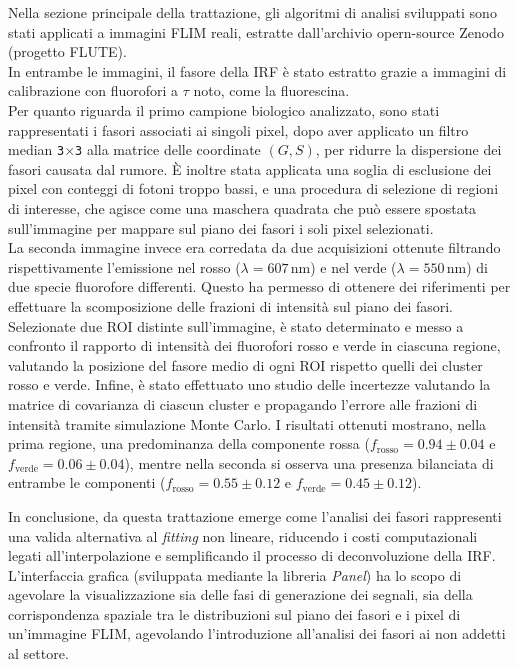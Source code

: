 \documentclass[a4paper, 11pt]{article}
\begin{document}
Nella sezione principale della trattazione, gli algoritmi di analisi sviluppati sono stati applicati a immagini FLIM reali, estratte dall'archivio opern-source Zenodo (progetto FLUTE).\\
In entrambe le immagini, il fasore della IRF è stato estratto grazie a immagini di calibrazione con fluorofori a $\tau$ noto, come la fluorescina.\\
Per quanto riguarda il primo campione biologico analizzato, sono stati rappresentati i fasori associati ai singoli pixel, dopo aver applicato un filtro median \texttt{3}$\times$\texttt{3} alla matrice delle coordinate $(G, S)$, per ridurre la dispersione dei fasori causata dal rumore. È inoltre stata applicata una soglia di esclusione dei pixel con conteggi di fotoni troppo bassi, e una procedura di selezione di regioni di interesse, che agisce come una maschera quadrata che può essere spostata sull'immagine per mappare sul piano dei fasori i soli pixel selezionati.\\
La seconda immagine invece era corredata da due acquisizioni ottenute filtrando rispettivamente l'emissione nel rosso ($\lambda = 607\, \text{nm}$) e nel verde ($\lambda = 550\, \text{nm}$) di due specie fluorofore differenti. Questo ha permesso  di ottenere dei riferimenti per effettuare la scomposizione delle frazioni di intensità sul piano dei fasori.\\

Selezionate due ROI distinte sull'immagine, è stato determinato e messo a confronto il rapporto di intensità dei fluorofori rosso e verde in ciascuna regione, valutando la posizione del fasore medio di ogni ROI rispetto quelli dei cluster rosso e verde. 
Infine, è stato effettuato uno studio delle incertezze valutando la matrice di covarianza di ciascun cluster e propagando l'errore alle frazioni di intensità tramite simulazione Monte Carlo. 
I risultati ottenuti mostrano, nella prima regione, una predominanza della componente rossa ($f_{\text{rosso}} = 0.94 \pm 0.04$ e $f_{\text{verde}} = 0.06 \pm 0.04$), mentre nella seconda si osserva una presenza bilanciata di entrambe le componenti ($f_{\text{rosso}} = 0.55 \pm 0.12$ e $f_{\text{verde}} = 0.45 \pm 0.12$).

In conclusione, da questa trattazione emerge come l'analisi dei fasori rappresenti una valida alternativa al \textit{fitting} non lineare, riducendo i costi computazionali legati all'interpolazione e semplificando il processo di deconvoluzione della IRF.\\
L'interfaccia grafica (sviluppata mediante la libreria \textit{Panel}) ha lo scopo di agevolare la visualizzazione sia delle fasi di generazione dei segnali, sia della corrispondenza spaziale tra le distribuzioni sul piano dei fasori e i pixel di un'immagine FLIM, agevolando l'introduzione all'analisi dei fasori ai non addetti al settore.\\
\end{document}
